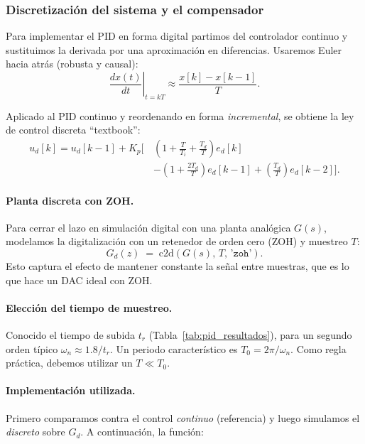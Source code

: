 \subsubsection{Discretización del sistema y el compensador}

Para implementar el PID en forma digital partimos del controlador continuo y sustituimos la derivada por una aproximación en diferencias. Usaremos Euler hacia atrás (robusta y causal):
\[
\left.\frac{dx(t)}{dt}\right|_{t=kT} \approx \frac{x[k]-x[k-1]}{T}.
\]


Aplicado al PID continuo y reordenando en forma \emph{incremental}, se obtiene la ley de control discreta ``textbook'':
\begingroup\small
\begin{equation}
	\label{eq:pid_incremental}
	\begin{aligned}
		u_d[k] = u_d[k-1] + K_p \big[\, &
		\left(1+\tfrac{T}{T_i}+\tfrac{T_d}{T}\right)e_d[k] \\
		& -\left(1+\tfrac{2T_d}{T}\right)e_d[k-1]
		+\left(\tfrac{T_d}{T}\right)e_d[k-2] \big].
	\end{aligned}
\end{equation}
\endgroup



\paragraph{Planta discreta con ZOH.}
Para cerrar el lazo en simulación digital con una planta analógica \(G(s)\), modelamos la digitalización con un retenedor de orden cero (ZOH) y muestreo \(T\):
\[
G_d(z) \;=\; \mathrm{c2d}\!\left(G(s),\,T,\,\texttt{'zoh'}\right).
\]
Esto captura el efecto de mantener constante la señal entre muestras, que es lo que hace un DAC ideal con ZOH.

\paragraph{Elección del tiempo de muestreo.}
Conocido el tiempo de subida \(t_r\) (Tabla~\ref{tab:pid_resultados}), para un segundo orden típico \( \omega_n \approx 1.8/t_r\). Un periodo característico es \(T_0 = 2\pi/\omega_n\). Como regla práctica, debemos utilizar un \(T\ll T_0\).



\onecolumn
\paragraph{Implementación utilizada.}
Primero comparamos contra el control \emph{continuo} (referencia) y luego simulamos el \emph{discreto} sobre \(G_d\). A continuación, la función:

